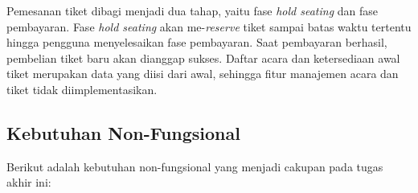 Pemesanan tiket dibagi menjadi dua tahap, yaitu fase \textit{hold seating} dan fase pembayaran. Fase \textit{hold seating} akan me-\textit{reserve} tiket sampai batas waktu tertentu hingga pengguna menyelesaikan fase pembayaran. Saat pembayaran berhasil, pembelian tiket baru akan dianggap sukses. Daftar acara dan ketersediaan awal tiket merupakan data yang diisi dari awal, sehingga fitur manajemen acara dan tiket tidak diimplementasikan.

\subsection{Kebutuhan Non-Fungsional}

Berikut adalah kebutuhan non-fungsional yang menjadi cakupan pada tugas akhir ini:

\begingroup
\footnotesize
